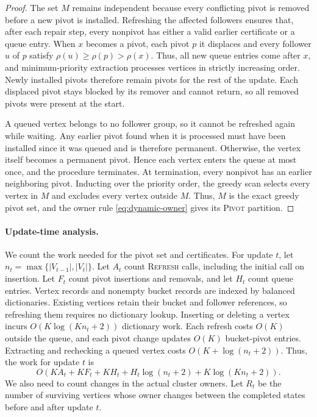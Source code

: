 \documentclass[11pt]{article}
\theoremstyle{definition}
\theoremstyle{remark}
\newcommand{\1}{\mathbf{1}}
\begin{document}
\begin{proof}
The set $M$ remains independent because every conflicting pivot is removed before a new pivot is installed. Refreshing the affected followers ensures that, after each repair step, every nonpivot has either a valid earlier certificate or a queue entry.
When $x$ becomes a pivot, each pivot $p$ it displaces and every follower $u$ of $p$ satisfy $\rho(u)\geq\rho(p)>\rho(x)$. Thus, all new queue entries come after $x$, and minimum-priority extraction processes vertices in strictly increasing order. Newly installed pivots therefore remain pivots for the rest of the update. Each displaced pivot stays blocked by its remover and cannot return, so all removed pivots were present at the start.

A queued vertex belongs to no follower group, so it cannot be refreshed again while waiting. Any earlier pivot found when it is processed must have been installed since it was queued and is therefore permanent. Otherwise, the vertex itself becomes a permanent pivot. Hence each vertex enters the queue at most once, and the procedure terminates.
At termination, every nonpivot has an earlier neighboring pivot. Inducting over the priority order, the greedy scan selects every vertex in $M$ and excludes every vertex outside $M$. Thus, $M$ is the exact greedy pivot set, and the owner rule \eqref{eq:dynamic-owner} gives its \textsc{Pivot} partition.
\end{proof}

\paragraph{Update-time analysis.}
We count the work needed for the pivot set and certificates. For update $t$, let $n_t=\max\{|V_{t-1}|,|V_t|\}$. Let $A_t$ count \textsc{Refresh} calls, including the initial call on
insertion. Let $F_t$ count pivot insertions and removals, and let $H_t$
count queue entries.
Vertex records and nonempty bucket records are indexed by balanced dictionaries. Existing vertices retain their bucket and follower references, so refreshing them requires no dictionary lookup. Inserting or deleting a vertex incurs $O(K\log(Kn_t+2))$ dictionary work.
Each refresh costs $O(K)$ outside the queue, and each pivot change updates $O(K)$ bucket-pivot entries. Extracting and rechecking a queued vertex costs $O(K+\log(n_t+2))$. Thus, the work for update $t$ is
\begin{equation}
    O\!\left(
        KA_t+KF_t+KH_t
        +H_t\log(n_t+2)
        +K\log(Kn_t+2)
    \right).
    \label{eq:pivot-update-work}
\end{equation}
We also need to count changes in the actual cluster owners. Let $R_t$ be the number of surviving vertices whose owner changes between the completed states before and after update $t$.
\end{document}
